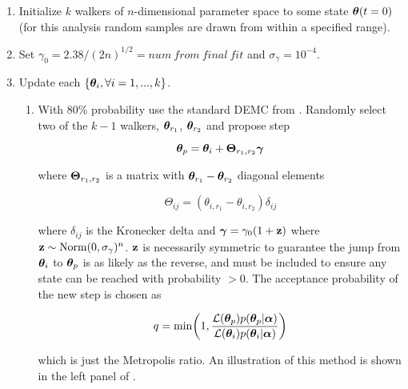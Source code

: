 \begin{enumerate}
\item Initialize $k$ walkers of $n$-dimensional parameter space to some state $\boldsymbol{\theta}(t = 0)$ (for this analysis random samples
are drawn from within a specified range).

\item Set $\gamma_0 = 2.38 / (2 n)^{1/2} = num\ from\ final\ fit$ and $\sigma_{\gamma} = 10^{-4}$.

\item \label{itm:update_demc} Update each $\{\boldsymbol{\theta}_i, \forall i = 1, ..., k\}$.
\begin{enumerate}
\item \label{itm:update_demc_normal} With 80\% probability use the standard DEMC from .  Randomly
select two of the $k - 1$ walkers, $\boldsymbol{\theta}_{r_1}$, $\boldsymbol{\theta}_{r_2}$ and propose step

\begin{equation}
\boldsymbol{\theta}_p = \boldsymbol{\theta}_i + \boldsymbol{\Theta}_{r_1, r_2} \boldsymbol{\gamma}
\label{eq:elifetime_fit_mcmc_update_demc}
\end{equation}

\noindent where $\boldsymbol{\Theta}_{r_1, r_2}$ is a matrix with $\boldsymbol{\theta}_{r_1} - \boldsymbol{\theta}_{r_2}$ diagonal
elements

\begin{equation}
\Theta_{ij} = (\theta_{i, r_1} - \theta_{i, r_2}) \delta_{ij}
\end{equation}

\noindent where $\delta_{ij}$ is the Kronecker delta  and $\boldsymbol{\gamma} = \gamma_0 (1 + \mathbf{z})$ where
$\mathbf{z} \sim \mathrm{Norm}(0, \sigma_{\gamma})^n$.  $\mathbf{z}$ is necessarily symmetric to guarantee the jump from
$\boldsymbol{\theta}_i$ to $\boldsymbol{\theta}_p$ is as likely as the reverse, and must be included to ensure any state can be reached with
probability $> 0$.  The acceptance probability of the new step is chosen as

\begin{equation}
q = \mathrm{min} \bigg( 1, \frac{\mathcal{L}(\boldsymbol{\theta}_p) p(\boldsymbol{\theta}_p|\boldsymbol{\alpha})}
{\mathcal{L}(\boldsymbol{\theta}_i) p(\boldsymbol{\theta}_i|\boldsymbol{\alpha})} \bigg)
\label{eq:elifetime_fit_mcmc_acc_demc}
\end{equation}

\noindent which is just the Metropolis ratio.  An illustration of this method is shown in the left panel of
.


\end{enumerate}
\end{enumerate}

